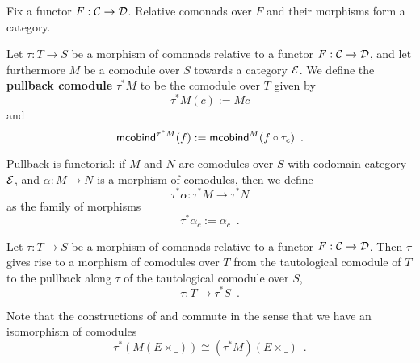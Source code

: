 \documentclass{amsart}
\newcommand{\fat}[1]{\textbf{#1}}
\begin{document}
\begin{remark}
 Fix a functor $F : \C\to\D$. Relative comonads over $F$ and their morphisms form a category.
\end{remark}


\begin{definition}\label{def:pullback_comodule}
  Let $\tau : T\to S$ be a morphism of comonads relative to a functor $F : \C \to \D$, and let furthermore $M$ be a 
  comodule over $S$ towards a category $\E$. We define the \fat{pullback comodule} $\tau^*M$ to be the comodule over $T$ given by
  \[  \tau^*M(c) := Mc \]
  and 
   \[ \mcobind^{\tau^*M}(f) := \mcobind^M(\comp{\tau_c}{f}) \enspace . \]
   
  \noindent
  Pullback is functorial: if $M$ and $N$ are comodules over $S$ with codomain category $\E$, and $\alpha : M\to N$ is 
    a morphism of comodules, then we define \[\tau^*\alpha : \tau^*M \to \tau^*N\] 
    as the family of morphisms
     \[ \tau^*\alpha_c := \alpha_c \enspace . \]
\end{definition}

\begin{definition}
  Let $\tau : T\to S$ be a morphism of comonads relative to a functor $F : \C \to \D$.
  Then $\tau$ gives rise to a morphism of comodules over $T$ from the tautological comodule
  of $T$ to the pullback along $\tau$ of the tautological comodule over $S$,
  \[ \tau : T \to \tau^*S \enspace . \]
\end{definition}


\begin{remark}\label{rem:prod_pullback_commute}
 Note that the constructions of  and  commute in the sense that
 we have an isomorphism of comodules \[\tau^*(M(E\times \_)) \cong (\tau^*M)(E \times \_) \enspace . \]
\end{remark}
\end{document}
